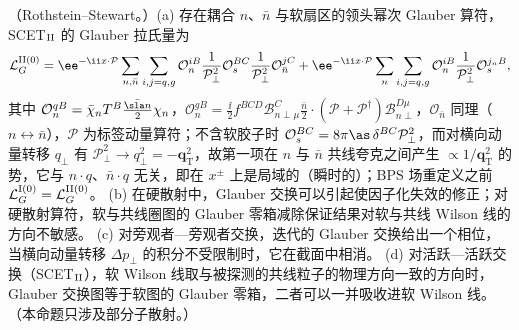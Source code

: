 \begin{proposition}\label{prop:scet-glauber-operators}
（Rothstein--Stewart\cite{RothsteinStewart2016}。）(a) 存在耦合 $n$、$\bar n$ 与软扇区的领头幂次 Glauber 算符，SCET$_{\rm II}$ 的 Glauber 拉氏量为\cite[式~(5.21)]{RothsteinStewart2016}
\begin{equation}\label{eq:scet-LG}
\mathcal L_G^{\rm II(0)}=\ee^{-\ii x\cdot\mathcal P}\sum_{n,\bar n}\sum_{i,j=q,g}\mathcal O_n^{iB}\frac{1}{\mathcal P_\perp^2}\mathcal O_s^{BC}\frac{1}{\mathcal P_\perp^2}\mathcal O_{\bar n}^{jC}
+\ee^{-\ii x\cdot\mathcal P}\sum_n\sum_{i,j=q,g}\mathcal O_n^{iB}\frac{1}{\mathcal P_\perp^2}\mathcal O_s^{j_nB},
\end{equation}
其中 $\mathcal O_n^{qB}=\bar\chi_nT^B\frac{\bar{\sla n}}{2}\chi_n$，$\mathcal O_n^{gB}=\frac\ii2f^{BCD}\mathcal B^C_{n\perp\mu}\frac{\bar n}{2}\cdot(\mathcal P+\mathcal P^\dagger)\mathcal B^{D\mu}_{n\perp}$，$\mathcal O_{\bar n}$ 同理（$n\leftrightarrow\bar n$），$\mathcal P$ 为标签动量算符；不含软胶子时 $\mathcal O_s^{BC}=8\pi\as\,\delta^{BC}\mathcal P_\perp^2$，而对横向动量转移 $q_\perp$ 有 $\mathcal P_\perp^2\to q_\perp^2=-\bm q_{\mathrm T}^2$，故第一项在 $n$ 与 $\bar n$ 共线夸克之间产生 $\propto1/\bm q_{\mathrm T}^2$ 的势，它与 $n\cdot q$、$\bar n\cdot q$ 无关，即在 $x^\pm$ 上是局域的（瞬时的）；BPS 场重定义之前 $\mathcal L_G^{\rm I(0)}=\mathcal L_G^{\rm II(0)}$。
(b) 在硬散射中，Glauber 交换可以引起使因子化失效的修正；对硬散射算符，软与共线圈图的 Glauber 零箱减除保证结果对软与共线 Wilson 线的方向不敏感\cite[摘要]{RothsteinStewart2016}。
(c) 对旁观者—旁观者交换，迭代的 Glauber 交换给出一个相位，当横向动量转移 $\Delta p_\perp$ 的积分不受限制时，它在截面中相消。
(d) 对活跃—活跃交换（SCET$_{\rm II}$），软 Wilson 线取与被探测的共线粒子的物理方向一致的方向时，Glauber 交换图等于软图的 Glauber 零箱，二者可以一并吸收进软 Wilson 线\cite[第~10、10.1~节]{RothsteinStewart2016}。
（本命题只涉及部分子散射。）
\end{proposition}

